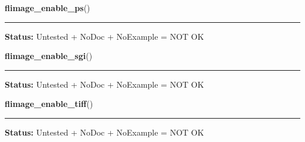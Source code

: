     \label{xformslib:library:flimage_enable_ps}

    \vspace{0.5ex}

\hspace{.8\funcindent}\begin{boxedminipage}{\funcwidth}

    \raggedright \textbf{flimage\_enable\_ps}()

    \vspace{-1.5ex}

    \rule{\textwidth}{0.5\fboxrule}
\setlength{\parskip}{2ex}
\setlength{\parskip}{1ex}
\textbf{Status:} Untested + NoDoc + NoExample = NOT OK



    \end{boxedminipage}

    \label{xformslib:library:flimage_enable_sgi}

    \vspace{0.5ex}

\hspace{.8\funcindent}\begin{boxedminipage}{\funcwidth}

    \raggedright \textbf{flimage\_enable\_sgi}()

    \vspace{-1.5ex}

    \rule{\textwidth}{0.5\fboxrule}
\setlength{\parskip}{2ex}
\setlength{\parskip}{1ex}
\textbf{Status:} Untested + NoDoc + NoExample = NOT OK



    \end{boxedminipage}

    \label{xformslib:library:flimage_enable_tiff}

    \vspace{0.5ex}

\hspace{.8\funcindent}\begin{boxedminipage}{\funcwidth}

    \raggedright \textbf{flimage\_enable\_tiff}()

    \vspace{-1.5ex}

    \rule{\textwidth}{0.5\fboxrule}
\setlength{\parskip}{2ex}
\setlength{\parskip}{1ex}
\textbf{Status:} Untested + NoDoc + NoExample = NOT OK



    \end{boxedminipage}

